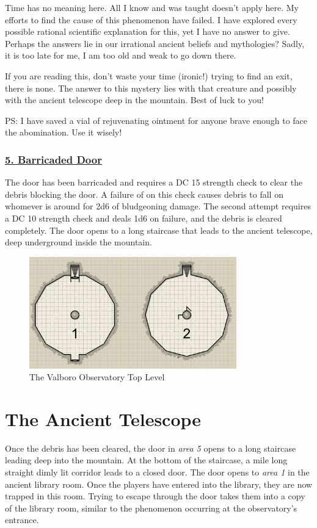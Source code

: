 \documentclass{article}
\begin{document}
\begin{multicols*}{2}
{\begin{minipage}{0.4\textwidth}
			Time has no meaning here. All I know and was taught doesn't apply here. My efforts to find the cause of this phenomenon have failed. I have explored every possible rational scientific explanation for this, yet I have no answer to give. Perhaps the answers lie in our irrational ancient beliefs and mythologies? Sadly, it is too late for me, I am too old and weak to go down there.
			
			If you are reading this, don't waste your time (ironic!) trying to find an exit, there is none. The answer to this mystery lies with that creature and possibly with the ancient telescope deep in the mountain. Best of luck to you!
			
			PS: I have saved a vial of rejuvenating ointment for anyone brave enough to face the abomination. Use it wisely!
			
	\end{minipage}}
	\break
	
	\subsubsection*{\underline{5. Barricaded Door}}
	The door has been barricaded and requires a DC 15 strength check to clear the debris blocking the door. A failure of on this check causes debris to fall on whomever is around for 2d6 of bludgeoning damage. The second attempt requires a DC 10 strength check and deals 1d6 on failure, and the debris is cleared completely. The door opens to a long staircase that leads to the ancient telescope, deep underground inside the mountain.
	
	\begin{figure}
	\centering
	\includegraphics[width=0.8\textwidth]{images/ancient_telescope}
	\caption{The Valboro Observatory Top Level}
	\end{figure}
	\section{The Ancient Telescope}
	Once the debris has been cleared, the door in \emph{area 5} opens to a long staircase leading deep into the mountain. At the bottom of the staircase, a mile long straight dimly lit corridor leads to a closed door. The door opens to \emph{area 1} in the ancient library room. Once the players have entered into the library, they are now trapped in this room. Trying to escape through the door takes them into a copy of the library room, similar to the phenomenon occurring at the observatory's entrance.
	

\end{multicols*}
\end{document}
